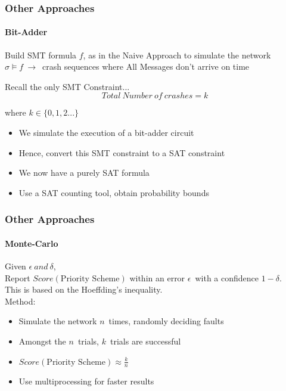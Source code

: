 \documentclass{beamer}
\begin{document}
\begin{frame}
\frametitle{Other Approaches}
\framesubtitle{Bit-Adder}
	Build SMT formula $f$, as in the Naive Approach to simulate the network
	$\sigma \vDash f\  \to$\ crash sequences where All Messages don't arrive on time
	\begin{block}{Recall the only SMT Constraint...}
	$$Total\ Number\ of\ crashes = k$$
	\begin{flushright}
		where $k\in\{0,1,2...\}$
	\end{flushright}
	\end{block}

	\pause

	\begin{itemize}
	\item We simulate the execution of a bit-adder circuit
	\item Hence, convert this SMT constraint to a SAT constraint
	\item We now have a purely SAT formula
	\item Use a SAT counting tool, obtain probability bounds
	\end{itemize}
\end{frame}

\begin{frame}
\frametitle{Other Approaches}
\framesubtitle{Monte-Carlo}
	Given $\epsilon \ and\ \delta$,\\
	Report $Score(\text{Priority Scheme})$ within an error $\epsilon$\ with a confidence $1-\delta$.\\[2ex]
	This is based on the Hoeffding's inequality.\\[2ex]
	Method:
	\begin{itemize}
	\item Simulate the network $n$\ times, randomly deciding faults
	\item Amongst the $n$\ trials, $k$\ trials are successful 
	\item $Score(\text{Priority Scheme}) \approx \frac{k}{n}$
	\item Use multiprocessing for faster results
	\end{itemize}
\end{frame}
\end{document}
